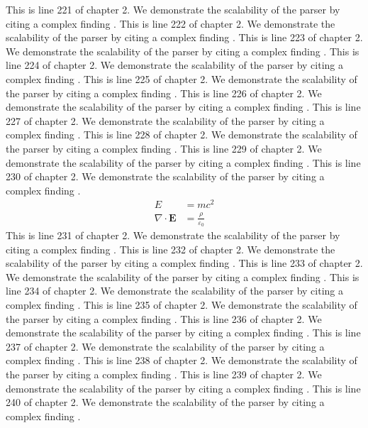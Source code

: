 This is line 221 of chapter 2. We demonstrate the scalability of the parser by citing a complex finding \cite{ref2_221}.
This is line 222 of chapter 2. We demonstrate the scalability of the parser by citing a complex finding \cite{ref2_222}.
This is line 223 of chapter 2. We demonstrate the scalability of the parser by citing a complex finding \cite{ref2_223}.
This is line 224 of chapter 2. We demonstrate the scalability of the parser by citing a complex finding \cite{ref2_224}.
This is line 225 of chapter 2. We demonstrate the scalability of the parser by citing a complex finding \cite{ref2_225}.
This is line 226 of chapter 2. We demonstrate the scalability of the parser by citing a complex finding \cite{ref2_226}.
This is line 227 of chapter 2. We demonstrate the scalability of the parser by citing a complex finding \cite{ref2_227}.
This is line 228 of chapter 2. We demonstrate the scalability of the parser by citing a complex finding \cite{ref2_228}.
This is line 229 of chapter 2. We demonstrate the scalability of the parser by citing a complex finding \cite{ref2_229}.
This is line 230 of chapter 2. We demonstrate the scalability of the parser by citing a complex finding \cite{ref2_230}.
\begin{align*}
  E &= mc^2 \\
  \nabla \cdot \mathbf{E} &= \frac{\rho}{\varepsilon_0}
\end{align*}
This is line 231 of chapter 2. We demonstrate the scalability of the parser by citing a complex finding \cite{ref2_231}.
This is line 232 of chapter 2. We demonstrate the scalability of the parser by citing a complex finding \cite{ref2_232}.
This is line 233 of chapter 2. We demonstrate the scalability of the parser by citing a complex finding \cite{ref2_233}.
This is line 234 of chapter 2. We demonstrate the scalability of the parser by citing a complex finding \cite{ref2_234}.
This is line 235 of chapter 2. We demonstrate the scalability of the parser by citing a complex finding \cite{ref2_235}.
This is line 236 of chapter 2. We demonstrate the scalability of the parser by citing a complex finding \cite{ref2_236}.
This is line 237 of chapter 2. We demonstrate the scalability of the parser by citing a complex finding \cite{ref2_237}.
This is line 238 of chapter 2. We demonstrate the scalability of the parser by citing a complex finding \cite{ref2_238}.
This is line 239 of chapter 2. We demonstrate the scalability of the parser by citing a complex finding \cite{ref2_239}.
This is line 240 of chapter 2. We demonstrate the scalability of the parser by citing a complex finding \cite{ref2_240}.
